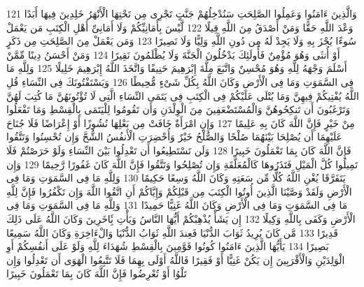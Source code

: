 {\tiny\colorbox{cl_aya}{121}} وَالَّذِينَ ءَامَنُوا وَعَمِلُوا الصَّلِحَتِ سَنُدْخِلُهُمْ جَنَّتٍ تَجْرِى مِن تَحْتِهَا الْأَنْهَرُ خَلِدِينَ فِيهَا أَبَدًا وَعْدَ اللَّهِ حَقًّا وَمَنْ أَصْدَقُ مِنَ اللَّهِ قِيلًا
{\tiny\colorbox{cl_aya}{122}} لَّيْسَ بِأَمَانِيِّكُمْ وَلَا أَمَانِىِّ أَهْلِ الْكِتَبِ مَن يَعْمَلْ سُوءًا يُجْزَ بِهِ وَلَا يَجِدْ لَهُ مِن دُونِ اللَّهِ وَلِيًّا وَلَا نَصِيرًا
{\tiny\colorbox{cl_aya}{123}} وَمَن يَعْمَلْ مِنَ الصَّلِحَتِ مِن ذَكَرٍ أَوْ أُنثَى وَهُوَ مُؤْمِنٌ فَأُولَئِكَ يَدْخُلُونَ الْجَنَّةَ وَلَا يُظْلَمُونَ نَقِيرًا
{\tiny\colorbox{cl_aya}{124}} وَمَنْ أَحْسَنُ دِينًا مِّمَّنْ أَسْلَمَ وَجْهَهُ لِلَّهِ وَهُوَ مُحْسِنٌ وَاتَّبَعَ مِلَّةَ إِبْرَهِيمَ حَنِيفًا وَاتَّخَذَ اللَّهُ إِبْرَهِيمَ خَلِيلًا
{\tiny\colorbox{cl_aya}{125}} وَلِلَّهِ مَا فِى السَّمَوَتِ وَمَا فِى الْأَرْضِ وَكَانَ اللَّهُ بِكُلِّ شَىْءٍ مُّحِيطًا
{\tiny\colorbox{cl_aya}{126}} وَيَسْتَفْتُونَكَ فِى النِّسَاءِ قُلِ اللَّهُ يُفْتِيكُمْ فِيهِنَّ وَمَا يُتْلَى عَلَيْكُمْ فِى الْكِتَبِ فِى يَتَمَى النِّسَاءِ الَّتِى لَا تُؤْتُونَهُنَّ مَا كُتِبَ لَهُنَّ وَتَرْغَبُونَ أَن تَنكِحُوهُنَّ وَالْمُسْتَضْعَفِينَ مِنَ الْوِلْدَنِ وَأَن تَقُومُوا لِلْيَتَمَى بِالْقِسْطِ وَمَا تَفْعَلُوا مِنْ خَيْرٍ فَإِنَّ اللَّهَ كَانَ بِهِ عَلِيمًا
{\tiny\colorbox{cl_aya}{127}} وَإِنِ امْرَأَةٌ خَافَتْ مِن بَعْلِهَا نُشُوزًا أَوْ إِعْرَاضًا فَلَا جُنَاحَ عَلَيْهِمَا أَن يُصْلِحَا بَيْنَهُمَا صُلْحًا وَالصُّلْحُ خَيْرٌ وَأُحْضِرَتِ الْأَنفُسُ الشُّحَّ وَإِن تُحْسِنُوا وَتَتَّقُوا فَإِنَّ اللَّهَ كَانَ بِمَا تَعْمَلُونَ خَبِيرًا
{\tiny\colorbox{cl_aya}{128}} وَلَن تَسْتَطِيعُوا أَن تَعْدِلُوا بَيْنَ النِّسَاءِ وَلَوْ حَرَصْتُمْ فَلَا تَمِيلُوا كُلَّ الْمَيْلِ فَتَذَرُوهَا كَالْمُعَلَّقَةِ وَإِن تُصْلِحُوا وَتَتَّقُوا فَإِنَّ اللَّهَ كَانَ غَفُورًا رَّحِيمًا
{\tiny\colorbox{cl_aya}{129}} وَإِن يَتَفَرَّقَا يُغْنِ اللَّهُ كُلًّا مِّن سَعَتِهِ وَكَانَ اللَّهُ وَسِعًا حَكِيمًا
{\tiny\colorbox{cl_aya}{130}} وَلِلَّهِ مَا فِى السَّمَوَتِ وَمَا فِى الْأَرْضِ وَلَقَدْ وَصَّيْنَا الَّذِينَ أُوتُوا الْكِتَبَ مِن قَبْلِكُمْ وَإِيَّاكُمْ أَنِ اتَّقُوا اللَّهَ وَإِن تَكْفُرُوا فَإِنَّ لِلَّهِ مَا فِى السَّمَوَتِ وَمَا فِى الْأَرْضِ وَكَانَ اللَّهُ غَنِيًّا حَمِيدًا
{\tiny\colorbox{cl_aya}{131}} وَلِلَّهِ مَا فِى السَّمَوَتِ وَمَا فِى الْأَرْضِ وَكَفَى بِاللَّهِ وَكِيلًا
{\tiny\colorbox{cl_aya}{132}} إِن يَشَأْ يُذْهِبْكُمْ أَيُّهَا النَّاسُ وَيَأْتِ بَِٔاخَرِينَ وَكَانَ اللَّهُ عَلَى ذَلِكَ قَدِيرًا
{\tiny\colorbox{cl_aya}{133}} مَّن كَانَ يُرِيدُ ثَوَابَ الدُّنْيَا فَعِندَ اللَّهِ ثَوَابُ الدُّنْيَا وَالْءَاخِرَةِ وَكَانَ اللَّهُ سَمِيعًا بَصِيرًا
{\tiny\colorbox{cl_aya}{134}} يَأَيُّهَا الَّذِينَ ءَامَنُوا كُونُوا قَوَّمِينَ بِالْقِسْطِ شُهَدَاءَ لِلَّهِ وَلَوْ عَلَى أَنفُسِكُمْ أَوِ الْوَلِدَيْنِ وَالْأَقْرَبِينَ إِن يَكُنْ غَنِيًّا أَوْ فَقِيرًا فَاللَّهُ أَوْلَى بِهِمَا فَلَا تَتَّبِعُوا الْهَوَى أَن تَعْدِلُوا وَإِن تَلْوُا أَوْ تُعْرِضُوا فَإِنَّ اللَّهَ كَانَ بِمَا تَعْمَلُونَ خَبِيرًا

